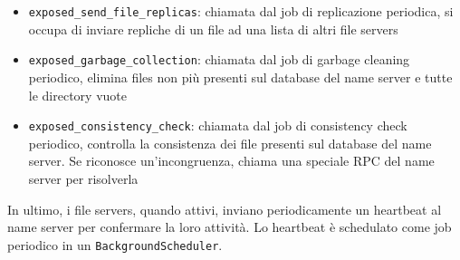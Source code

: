 \documentclass[a4paper, 12pt]{scrreprt}
\begin{document}
            \begin{itemize}

                \item \texttt{exposed\_send\_file\_replicas}: chiamata dal job di replicazione periodica, si occupa di inviare repliche di un file ad una lista di altri file servers

                \item \texttt{exposed\_garbage\_collection}: chiamata dal job di garbage cleaning periodico, elimina files non più presenti sul database del name server e tutte le directory vuote

                \item \texttt{exposed\_consistency\_check}: chiamata dal job di consistency check periodico, controlla la consistenza dei file presenti sul database del name server. Se riconosce un'incongruenza, chiama una speciale RPC del name server per risolverla

            \end{itemize}

            In ultimo, i file servers, quando attivi, inviano periodicamente un heartbeat al name server per confermare la loro attività. Lo heartbeat è schedulato come job periodico in un \texttt{BackgroundScheduler}.
\end{document}
